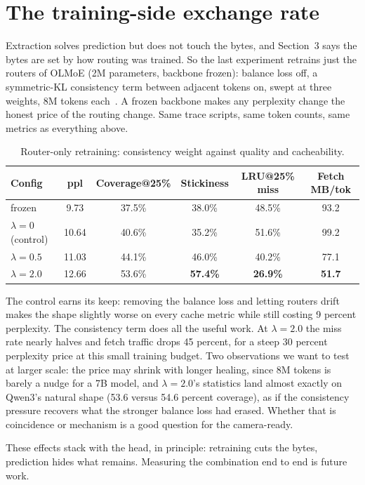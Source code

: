 \documentclass[11pt]{article}
\begin{document}
\section{The training-side exchange rate}
Extraction solves prediction but does not touch the bytes, and Section~3 says the bytes are set by how routing was trained. So the last experiment retrains just the routers of OLMoE (2M parameters, backbone frozen): balance loss off, a symmetric-KL consistency term between adjacent tokens on, swept at three weights, 8M tokens each~\citep{fineweb}. A frozen backbone makes any perplexity change the honest price of the routing change. Same trace scripts, same token counts, same metrics as everything above.

\begin{table}[h]
\centering\small
\begin{tabular}{lccccc}
\toprule
Config & ppl & Coverage@25\% & Stickiness & LRU@25\% miss & Fetch MB/tok \\
\midrule
frozen & 9.73 & 37.5\% & 38.0\% & 48.5\% & 93.2 \\
$\lambda=0$ (control) & 10.64 & 40.6\% & 35.2\% & 51.6\% & 99.2 \\
$\lambda=0.5$ & 11.03 & 44.1\% & 46.0\% & 40.2\% & 77.1 \\
$\lambda=2.0$ & 12.66 & 53.6\% & \textbf{57.4\%} & \textbf{26.9\%} & \textbf{51.7} \\
\bottomrule
\end{tabular}
\caption{Router-only retraining: consistency weight against quality and cacheability.}
\end{table}

The control earns its keep: removing the balance loss and letting routers drift makes the shape slightly worse on every cache metric while still costing 9 percent perplexity. The consistency term does all the useful work. At $\lambda=2.0$ the miss rate nearly halves and fetch traffic drops 45 percent, for a steep 30 percent perplexity price at this small training budget. Two observations we want to test at larger scale: the price may shrink with longer healing, since 8M tokens is barely a nudge for a 7B model, and $\lambda=2.0$'s statistics land almost exactly on Qwen3's natural shape (53.6 versus 54.6 percent coverage), as if the consistency pressure recovers what the stronger balance loss had erased. Whether that is coincidence or mechanism is a good question for the camera-ready.

These effects stack with the head, in principle: retraining cuts the bytes, prediction hides what remains. Measuring the combination end to end is future work.
\end{document}
